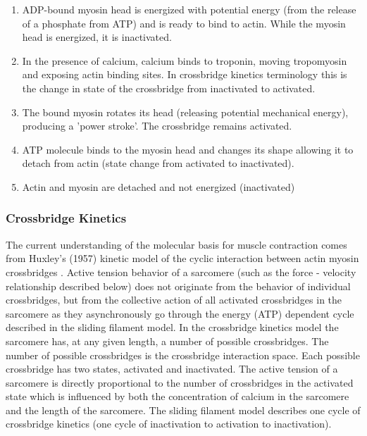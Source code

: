 \begin{enumerate}
\item ADP-bound myosin head is energized with potential energy (from the release of a phosphate from ATP) and is ready to bind to actin. While the myosin head is energized, it is inactivated.
\item In the presence of calcium, calcium binds to troponin, moving tropomyosin and exposing actin binding sites. In crossbridge kinetics terminology this is the change in state of the crossbridge from inactivated to activated.
\item The bound myosin rotates its head (releasing potential mechanical energy), producing a 'power stroke'. The crossbridge remains activated.
\item ATP molecule binds to the myosin head and changes its shape allowing it to detach from actin (state change from activated to inactivated).
\item Actin and myosin are detached and not energized (inactivated)
\end{enumerate}

\subsubsection{Crossbridge Kinetics}
The current understanding of the molecular basis for muscle contraction comes from Huxley’s (1957) kinetic model of the cyclic interaction between actin myosin crossbridges \cite{huxley_muscle_1957}. Active tension behavior of a sarcomere (such as the force - velocity relationship described below) does not originate from the behavior of individual crossbridges, but from the collective action of all activated crossbridges in the sarcomere as they asynchronously go through the energy (ATP) dependent cycle described in the sliding filament model. In the crossbridge kinetics model the sarcomere has, at any given length, a number of possible crossbridges.  The number of possible crossbridges is the crossbridge interaction space. Each possible crossbridge has two states, activated and inactivated. The active tension of a sarcomere is directly proportional to the number of crossbridges in the activated state which is influenced by both the concentration of calcium in the sarcomere and the length of the sarcomere. The sliding filament model describes one cycle of crossbridge kinetics (one cycle of inactivation to activation to inactivation).


